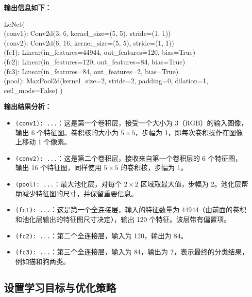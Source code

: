 \textbf{输出信息如下：}
\vspace{-2mm} %
\begin{tcolorbox}[colframe=blue!50!black, colback=blue!10!white, coltitle=black, sharp corners, top=0mm, bottom=0mm, boxrule=0.8mm]
LeNet(\\
  (conv1): Conv2d(3, 6, kernel\_size=(5, 5), stride=(1, 1))\\
  (conv2): Conv2d(6, 16, kernel\_size=(5, 5), stride=(1, 1))\\
  (fc1): Linear(in\_features=44944, out\_features=120, bias=True)\\
  (fc2): Linear(in\_features=120, out\_features=84, bias=True)\\
  (fc3): Linear(in\_features=84, out\_features=2, bias=True)\\
  (pool): MaxPool2d(kernel\_size=2, stride=2, padding=0, dilation=1, ceil\_mode=False)
)
\end{tcolorbox}
\vspace{-2mm} %
\textbf{输出结果分析：}
\begin{itemize}
  \item \texttt{(conv1): ...}：这是第一个卷积层，接受一个大小为 3（RGB）的输入图像，输出 6 个特征图。卷积核的大小为 $5 \times 5$，步幅为 1，即每次卷积操作在图像上移动 1 个像素。
  
  \item \texttt{(conv2): ...}：这是第二个卷积层，接收来自第一个卷积层的 6 个特征图，输出 16 个特征图，同样使用 $5 \times 5$ 的卷积核，步幅为 1。

  \item \texttt{(pool): ...}：最大池化层，对每个 $2 \times 2$ 区域取最大值，步幅为 2。池化层帮助减少特征图的尺寸，并保留重要信息。

  \item \texttt{(fc1): ...}：这是第一个全连接层，输入的特征数量为 44944（由前面的卷积和池化层输出的特征图尺寸决定），输出 120 个特征。该层带有偏置项。

  \item \texttt{(fc2): ...}：第二个全连接层，输入为 120，输出为 84。

  \item \texttt{(fc3): ...}：第三个全连接层，输入为 84，输出为 2，表示最终的分类结果，例如猫和狗两类。

\end{itemize}

\subsection{设置学习目标与优化策略}

